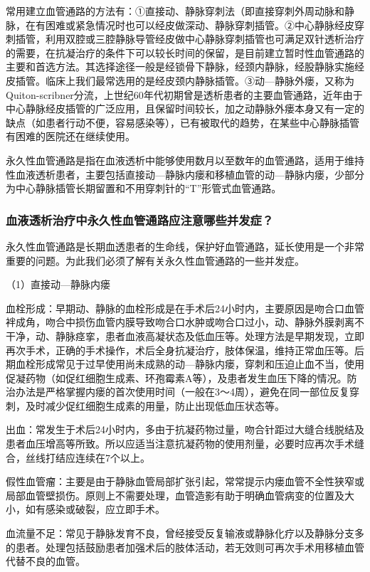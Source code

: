常用建立血管通路的方法有：①直接动、静脉穿刺法（即直接穿刺外周动脉和静脉，在有困难或紧急情况时也可以经皮做深动、静脉穿刺插管。②中心静脉经皮穿刺插管，利用双腔或三腔静脉导管经皮做中心静脉穿刺插管也可满足双针透析治疗的需要，在抗凝治疗的条件下可以较长时间的保留，是目前建立暂时性血管通路的主要和首选方法。其选择途径一般是经锁骨下静脉，经颈内静脉，经股静脉实施经皮插管。临床上我们最常选用的是经皮颈内静脉插管。③动---静脉外瘘，又称为Quiton-scribner分流，上世纪60年代初期曾是透析患者的主要血管通路，近年由于中心静脉经皮插管的广泛应用，且保留时间较长，加之动静脉外瘘本身又有一定的缺点（如患者行动不便，容易感染等），已有被取代的趋势，在某些中心静脉插管有困难的医院还在继续使用。

永久性血管通路是指在血液透析中能够使用数月以至数年的血管通路，适用于维持性血液透析患者，主要包括直接动---静脉内瘘和移植血管的动---静脉内瘘，少部分为中心静脉插管长期留置和不用穿刺针的“T”形管式血管通路。

\subsubsection{血液透析治疗中永久性血管通路应注意哪些并发症？}

永久性血管通路是长期血透患者的生命线，保护好血管通路，延长使用是一个非常重要的问题。为此我们必须了解有关永久性血管通路的一些并发症。

（1）直接动---静脉内瘘

血栓形成：早期动、静脉的血栓形成是在手术后24小时内，主要原因是吻合口血管袢成角，吻合中损伤血管内膜导致吻合口水肿或吻合口过小，动、静脉外膜剥离不干净，动、静脉痉挛，患者血液高凝状态及低血压等。处理方法是早期发现，立即再次手术，正确的手术操作，术后全身抗凝治疗，肢体保温，维持正常血压等。后期血栓形成常见于过早使用尚未成熟的动---静脉内瘘，穿刺和压迫止血不当，使用促凝药物（如促红细胞生成素、环孢霉素A等），及患者发生血压下降的情况。防治办法是严格掌握内瘘的首次使用时间（一般在3～4周），避免在同一部位反复穿刺，及时减少促红细胞生成素的用量，防止出现低血压状态等。

出血：常发生于术后24小时内，多由于抗凝药物过量，吻合针距过大缝合线脱结及患者血压增高等所致。所以应适当注意抗凝药物的使用剂量，必要时应再次手术缝合，丝线打结应连续在7个以上。

假性血管瘤：主要是由于静脉血管局部扩张引起，常常提示内瘘血管不全性狭窄或局部血管壁损伤。原则上不需要处理，血管造影有助于明确血管病变的位置及大小，如有感染或破裂，应立即手术。

血流量不足：常见于静脉发育不良，曾经接受反复输液或静脉化疗以及静脉分支多的患者。处理包括鼓励患者加强术后的肢体活动，若无效则可再次手术用移植血管代替不良的血管。

